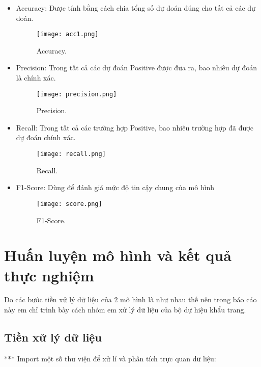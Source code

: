 \begin{itemize}
	\item Accuracy: Được tính bằng cách chia tổng số dự đoán đúng cho tất cả các dự đoán.
	
	\begin{figure}[h!]
		\centering
		\texttt{[image: acc1.png]}
		\caption[Accuracy.]{Accuracy.}
		\label{fig:acc} 
	\end{figure}
		
	\item Precision: Trong tất cả các dự đoán Positive được đưa ra, bao nhiêu dự đoán là chính xác.
	
	\begin{figure}[h!]
		\centering
		\texttt{[image: precision.png]}
		\caption[Precision.]{Precision.}
		\label{fig:precision} 
	\end{figure}
	
	\item Recall: Trong tất cả các trường hợp Positive, bao nhiêu trường hợp đã được dự đoán chính xác.		
	
	\begin{figure}[h!]
		\centering
		\texttt{[image: recall.png]}
		\caption[Recall.]{Recall.}
		\label{fig:recall} 
	\end{figure}

	\item F1-Score: Dùng để đánh giá mức độ tin cậy chung của mô hình
	
	\begin{figure}[h!]
		\centering
		\texttt{[image: score.png]}
		\caption[F1-Score.]{F1-Score.}
		\label{fig:score} 
	\end{figure}
\end{itemize}

\section{Huấn luyện mô hình và kết quả thực nghiệm}

Do các bước tiền xử lý dữ liệu của 2 mô hình là như nhau thế nên trong báo cáo này em chỉ trình bày cách nhóm em xử lý dữ liệu của bộ dự hiệu khẩu trang.

\subsection{Tiền xử lý dữ liệu} 

*** Import một số thư viện để xử lí và phân tích trực quan dữ liệu:

